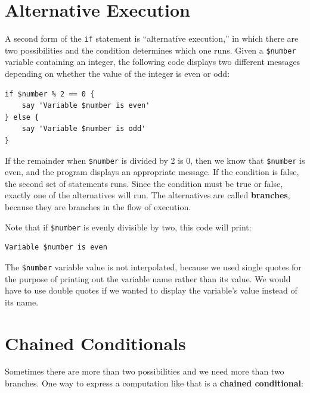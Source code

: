 \section{Alternative Execution}
\label{alternative.execution}

A second form of the {\tt if} statement is ``alternative execution,'' 
in which there are two possibilities and the condition determines
which one runs.  Given a \verb'$number' variable containing an 
integer, the following code displays two different messages 
depending on whether the value of the integer is even or odd:

\begin{verbatim}
if $number % 2 == 0 {
    say 'Variable $number is even'
} else {
    say 'Variable $number is odd'
}
\end{verbatim}
%
If the remainder when {\tt \$number} is divided by 2 is 0, 
then we know that {\tt \$number} is even, and the program 
displays an appropriate message.  If
the condition is false, the second set of statements runs.
Since the condition must be true or false, exactly one of the
alternatives will run.  The alternatives are called 
{\bf branches}, because they are branches in the flow of 
execution.

Note that if \verb'$number' is evenly divisible by two, 
this code will print:

\begin{verbatim} 
Variable $number is even
\end{verbatim}

The \verb'$number' variable value is not interpolated, 
because we used single quotes for the purpose 
of printing out the variable name rather 
than its value. We would have to use double quotes if 
we wanted to display the variable's value instead of its 
name.


\section{Chained Conditionals}

Sometimes there are more than two possibilities and we need more than
two branches.  One way to express a computation like that is a 
{\bf chained conditional}:


